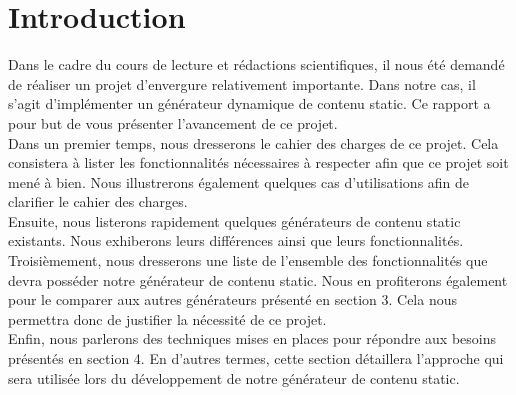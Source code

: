 \section{Introduction}

	Dans le cadre du cours de lecture et rédactions scientifiques, il nous été demandé de réaliser un projet d'envergure relativement importante. Dans notre cas, il s'agit d'implémenter un générateur dynamique de contenu static. Ce rapport a pour but de vous présenter l'avancement de ce projet.\\
	
	Dans un premier temps, nous dresserons le cahier des charges de ce projet. Cela consistera à lister les fonctionnalités nécessaires à respecter afin que ce projet soit mené à bien. Nous illustrerons également quelques cas d'utilisations afin de clarifier le cahier des charges.\\
	
	Ensuite, nous listerons rapidement quelques générateurs de contenu static existants. Nous exhiberons leurs différences ainsi que leurs fonctionnalités.\\
	
	Troisièmement, nous dresserons une liste de l'ensemble des fonctionnalités que devra posséder notre générateur de contenu static. Nous en profiterons également pour le comparer aux autres générateurs présenté en section 3. Cela nous permettra donc de justifier la nécessité de ce projet.\\
	
	Enfin, nous parlerons des techniques mises en places pour répondre aux besoins présentés en section 4. En d'autres termes, cette section détaillera l'approche qui sera utilisée lors du développement de notre générateur de contenu static.

	